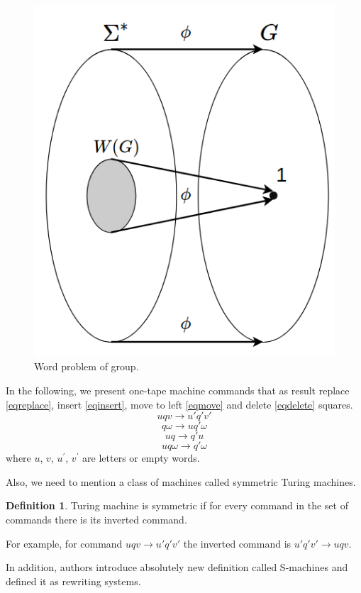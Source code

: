 \documentclass[conference]{IEEEtran}
\theoremstyle{definition}
\newtheorem{defn}{Definition}[section]
\begin{document}
\begin{figure}[tp]
\centerline{\includegraphics[width=0.6\linewidth]{pics/3.png}}
\caption{Word problem of group.}
\label{fig:word_problem}
\end{figure}

In the following, we present one-tape machine commands that as result replace \eqref{eqreplace},
insert \eqref{eqinsert}, move to left \eqref{eqmove} and delete \eqref{eqdelete} squares.
\begin{equation}
    u q v \to u' q' v' \label{eqreplace}
\end{equation}
\begin{equation}
    q \omega \to u q' \omega \label{eqinsert}
\end{equation}
\begin{equation}
    u q \to q' u \label{eqmove}
\end{equation}
\begin{equation}
    u q \omega \to q' \omega \label{eqdelete}
\end{equation}
where $u$, $v$, $u^{'}$, $v^{'}$ are letters or empty words.

Also, we need to mention a class of machines called symmetric Turing machines.
\begin{defn}
Turing machine is symmetric if for every command in the set of commands there
is its inverted command.
\end{defn}
For  example, for command
$u q v \to u' q' v'$ the inverted command is $u' q' v' \to u q v$.

In addition, authors introduce absolutely new definition called S-machines and defined it as rewriting systems.
\end{document}
